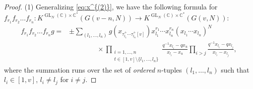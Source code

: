 \documentclass[12pt]{amsart}
\def\Bbb{\mathbb}
\theoremstyle{definition}
\theoremstyle{remark}
\numberwithin{equation}{subsection}
\newcommand{\C}{{\Bbb C}}
\newcommand{\GL}{\operatorname{GL}}
\begin{document}
\begin{proof}
(1) Generalizing \eqref{eq:x^{(2)}}, we have the following formula
for $f_{r_1}f_{r_2}\dots f_{r_n}\colon 
K^{\GL_N(\C)\times\C^*}(G(v-n,N)) \to
K^{\GL_N(\C)\times\C^*}(G(v,N))$:
\begin{equation*}
\begin{split}
   f_{r_1}f_{r_2}\dots f_{r_n} g =&
   \pm \sum_{(l_1, \dots, l_n)}
         g(x_{\tau_{l_1}^+\cdots\tau_{l_n}^+[v]})
         x_{l_1}^{r_1}\cdots x_{l_n}^{r_n}
    {(x_{l_1}\cdots x_{l_n})}^{N}
\\
   &\qquad\qquad\times  
  \prod_{\substack{i=1,\dots, n\\
                   t\in [1,v]\setminus \{l_1,\dots, l_n\}}}
    \frac{q^{-1} x_{l_i} - q x_u}{x_{l_i} - x_u}
    \prod_{i > j}
    \frac{q^{-1} x_{l_i} - q x_{l_j}}{x_{l_i} - x_{l_j}},
\end{split}
\end{equation*}
where the summation runs over the set of {\it ordered\/} $n$-tuples
$(l_1, \dots, l_n)$ such that $l_i\in [1,v]$, $l_i\neq l_j$ for $i\neq
j$.



\end{proof}
\end{document}
